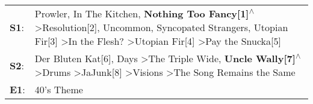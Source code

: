\begin{supertabular}{p{0.03\textwidth}p{0.92\textwidth}}
 \textbf{S1}:  &  Prowler\textsuperscript{}, \enspace In The Kitchen\textsuperscript{}, \enspace \textbf{Nothing Too Fancy[1]\textsuperscript{$\wedge$}} \textgreater \enspace Resolution[2]\textsuperscript{}, \enspace Uncommon\textsuperscript{}, \enspace Syncopated Strangers\textsuperscript{}, \enspace Utopian Fir[3]\textsuperscript{} \textgreater \enspace In the Flesh?\textsuperscript{} \textgreater \enspace Utopian Fir[4]\textsuperscript{} \textgreater \enspace Pay the Snucka[5]\textsuperscript{}  \enspace  \\
 \textbf{S2}:  &                                                                                         Der Bluten Kat[6]\textsuperscript{},  Days\textsuperscript{} \textgreater \enspace The Triple Wide\textsuperscript{}, \enspace \textbf{Uncle Wally[7]\textsuperscript{$\wedge$}} \textgreater \enspace Drums\textsuperscript{} \textgreater \enspace JaJunk[8]\textsuperscript{} \textgreater \enspace Visions\textsuperscript{} \textgreater \enspace The Song Remains the Same\textsuperscript{}  \enspace  \\
 \textbf{E1}:  &                                                                                                                                                                                                                                                                                                                                                                                                                                                                          40's Theme\textsuperscript{}  \enspace  \\
\end{supertabular}
